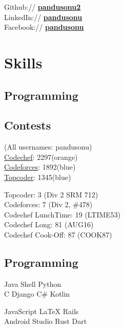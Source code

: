 \documentclass[a4paper]{deedy-resume} %
\begin{document}
\begin{minipage}[t]{0.33\textwidth}
Github:// \href{https://github.com/pandusonu2}{\bf pandusonu2} \\
LinkedIn:// \href{https://www.linkedin.com/in/pandusonu}{\bf pandusonu} \\
Facebook:// \href{https://www.facebook.com/pandu.sonu}{\bf pandusonu} \\

\sectionspace %

\section{Skills}

\sectionspace

\subsection{Programming}
\subsection{Contests}
(All usernames: pandusonu) \\
\href{https://www.codechef.com/users/pandusonu}{Codechef}: 2297(orange)\\
\href{http://codeforces.com/profile/pandusonu}{Codeforces}: 1892(blue) \\
\href{https://www.topcoder.com/members/pandusonu/}{Topcoder}: 1345(blue)\\

\sectionspace

Topcoder: 3 (Div 2 SRM 712)\\
Codeforces: 7 (Div 2, \#478)\\
Codechef LunchTime: 19 (LTIME53)\\
Codechef Long: 81 (AUG16)\\
Codechef Cook-Off: 87 (COOK87)

\sectionspace

\subsection{Programming}

Java \textbullet{} Shell \textbullet{} Python \textbullet{} \\
C \textbullet{} Django \textbullet{} C\# \textbullet{} Kotlin

\sectionspace

JavaScript \textbullet{} \LaTeX \textbullet{} Rails \textbullet{} \\
Android Studio \textbullet{} Rust \textbullet{} Dart




\end{minipage} %
\end{document}
